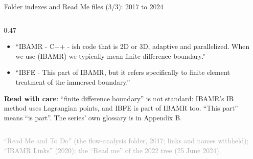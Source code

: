 \documentclass[aspectratio=169,11pt]{beamer}
\newcommand{\sourcecredit}[1]{\vfill\begin{flushright}\tiny\textcolor{DarkGray}{#1}\end{flushright}}
\begin{document}
\begin{frame}{Folder indexes and Read Me files (3/3): 2017 to 2024}
\begin{columns}[T,onlytextwidth]
\begin{column}{0.47\textwidth}
\begin{itemize}
  \item ``IBAMR - C++ - ish code that is 2D or 3D, adaptive and parallelized. When we use (IBAMR) we typically mean finite difference boundary.''
  \item ``IBFE - This part of IBAMR, but it refers specifically to finite element treatment of the immersed boundary.''
\end{itemize}
\begin{punchbox}
\scriptsize \textbf{Read with care}: ``finite difference boundary'' is not standard: IBAMR's IB method uses Lagrangian points, and IBFE is part of IBAMR too. ``This part'' means ``is part''. The series' own glossary is in Appendix B.
\end{punchbox}
\end{column}
\end{columns}
\sourcecredit{``Read Me and To Do'' (the flow-analysis folder, 2017; links and names withheld); ``IBAMR Links'' (2020); the ``Read me'' of the 2022 tree (25 June 2024).}
\end{frame}
\end{document}
